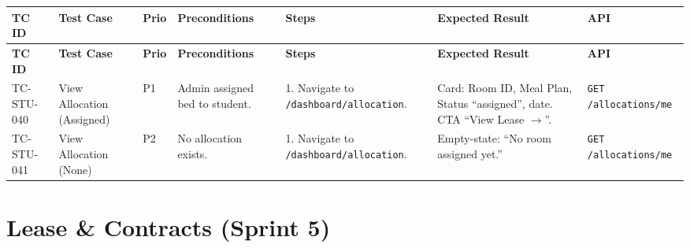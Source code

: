 \documentclass[12pt,a4paper]{article}
\begin{document}
\begin{longtable}{L{2cm} L{3cm} L{1cm} L{4cm} L{5.5cm} L{5.5cm} L{3cm}}
\toprule
\textbf{TC ID} & \textbf{Test Case} & \textbf{Prio} & \textbf{Preconditions} & \textbf{Steps} & \textbf{Expected Result} & \textbf{API} \\
\midrule
\endfirsthead
\toprule
\textbf{TC ID} & \textbf{Test Case} & \textbf{Prio} & \textbf{Preconditions} & \textbf{Steps} & \textbf{Expected Result} & \textbf{API} \\
\midrule
\endhead
\bottomrule
\endfoot

TC-STU-040
& View Allocation (Assigned)
& P1
& Admin assigned bed to student.
& 1. Navigate to \texttt{/dashboard/allocation}.
& Card: Room ID, Meal Plan, Status ``assigned'', date. CTA ``View Lease $\rightarrow$''.
& \texttt{GET /allocations/me}
\\
\midrule

TC-STU-041
& View Allocation (None)
& P2
& No allocation exists.
& 1. Navigate to \texttt{/dashboard/allocation}.
& Empty-state: ``No room assigned yet.''
& \texttt{GET /allocations/me}
\\

\end{longtable}


\section{Lease \& Contracts (Sprint 5)}
\end{document}
